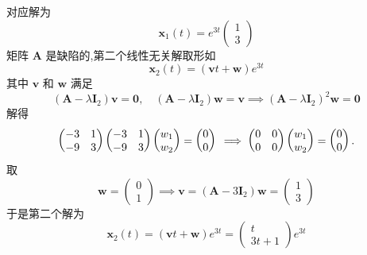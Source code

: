 \begin{questions}
\begin{solution}
\[        \]
        对应解为
        \[
        \boldsymbol{x}_1(t) = e^{3t} \begin{pmatrix} 1 \\ 3 \end{pmatrix}
        \]
        矩阵 $\boldsymbol{A}$ 是缺陷的,第二个线性无关解取形如
        \[
        \boldsymbol{x}_2(t) = (\boldsymbol{v} t + \boldsymbol{w}) e^{3t}
        \]
        其中 $\boldsymbol{v}$ 和 $\boldsymbol{w}$ 满足
        \[
        (\boldsymbol{A}-\lambda\boldsymbol{I}_2)\boldsymbol{v} = \boldsymbol{0}, \quad (\boldsymbol{A}-\lambda\boldsymbol{I}_2)\boldsymbol{w} = \boldsymbol{v} \implies (\boldsymbol{A} - \lambda \boldsymbol{I}_2)^2\boldsymbol{w} = \boldsymbol{0}
        \]
        解得
        \[
        \begin{pmatrix} -3 & 1 \\ -9 & 3 \end{pmatrix}\begin{pmatrix} -3 & 1 \\ -9 & 3 \end{pmatrix} \begin{pmatrix} w_1 \\ w_2 \end{pmatrix} = \begin{pmatrix} 0 \\ 0 \end{pmatrix} \\
        \implies \begin{pmatrix} 0 & 0 \\ 0 & 0 \end{pmatrix} \begin{pmatrix} w_1 \\ w_2 \end{pmatrix} = \begin{pmatrix} 0 \\ 0 \end{pmatrix}.
        \]
        取
        \[
        \boldsymbol{w} = \begin{pmatrix} 0 \\ 1 \end{pmatrix} \implies \boldsymbol{v} = (\boldsymbol{A}-3\boldsymbol{I}_2)\boldsymbol{w} = \begin{pmatrix} 1 \\ 3 \end{pmatrix}
        \]
        于是第二个解为
        \[
        \boldsymbol{x}_2(t) = (\boldsymbol{v} t + \boldsymbol{w}) e^{3t} = \begin{pmatrix} t \\ 3t+1 \end{pmatrix} e^{3t}
\]
\end{solution}
\end{questions}
